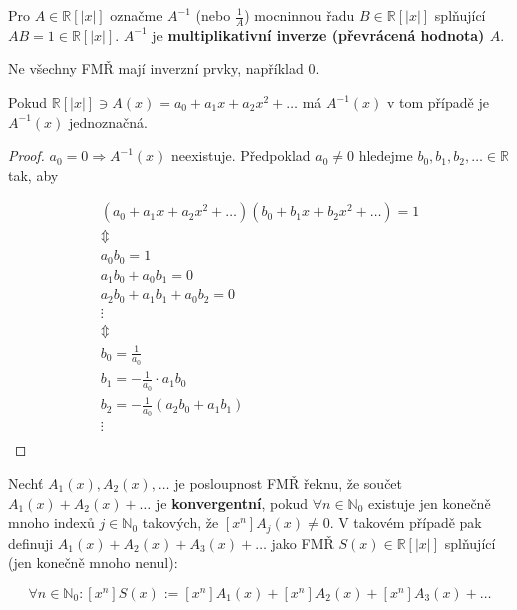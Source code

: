 \begin{definice}
	Pro $A \in \mathbb{R}[|x|]$ označme $A^{-1}$ (nebo $\frac{1}{A}$) mocninnou řadu $B \in \mathbb{R}[|x|]$ splňující $AB = 1 \in \mathbb{R}[|x|]$. $A^{-1}$ je \textbf{multiplikativní inverze (převrácená hodnota) $A$}.
\end{definice}

\begin{pozn}
	Ne všechny FMŘ mají inverzní prvky, například $0$.
\end{pozn}

\begin{tvrz}
	Pokud $\mathbb{R}[|x|] \ni A(x) = a_{0} + a_{1} x + a_{2} x^{2} + \dots$ má $A^{-1}(x)$ v tom případě je $A^{-1}(x)$ jednoznačná.
\end{tvrz}

\begin{proof}
	$a_{0} = 0 \Rightarrow A^{-1}(x)$ neexistuje. Předpoklad $a_{0} \neq 0$ hledejme $b_{0},b_{1},b_{2},\dots \in \mathbb{R}$ tak, aby
	
	$$
	\begin{array}{c}
		(a_{0} + a_{1} x + a_{2} x^{2} + \dots)(b_{0} + b_{1} x + b_{2} x^{2} + \dots) = 1 \\
		\Updownarrow \\
		a_{0}b_{0} = 1 \\
		a_{1}b_{0} + a_{0}b_{1} = 0 \\
		a_{2}b_{0} + a_{1}b_{1} + a_{0}b_{2} = 0 \\
		\vdots \\
		\Updownarrow \\
		b_{0} = \frac{1}{a_{0}} \\
		b_{1} = - \frac{1}{a_{0}} \cdot a_{1}b_{0} \\
		b_{2} = - \frac{1}{a_{0}}(a_{2}b_{0} + a_{1}b_{1}) \\
		\vdots \\
	\end{array}
	$$
\end{proof}

\begin{definice}
	Nechť $A_{1}(x), A_{2}(x), \dots$ je posloupnost FMŘ řeknu, že součet $A_{1}(x) + A_{2}(x) + \dots$ je \textbf{konvergentní}, pokud $\forall n \in \mathbb{N}_{0}$ existuje jen konečně mnoho indexů $j \in \mathbb{N}_{0}$ takových, že $[x^{n}]A_{j}(x) \neq 0$. V takovém případě pak definuji $A_{1}(x) + A_{2}(x) + A_{3}(x) + \dots$ jako FMŘ $S(x) \in \mathbb{R}[|x|]$ splňující (jen konečně mnoho nenul):
	
	$$
	\forall n \in \mathbb{N}_{0}: [x^{n}]S(x) := [x^{n}]A_{1}(x) + [x^{n}]A_{2}(x) + [x^{n}]A_{3}(x) + \dots
	$$
\end{definice}

